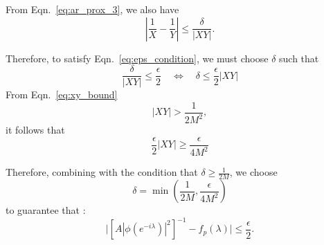 \documentclass[preprint]{aastex}
\theoremstyle{nonitalicname}
\theoremstyle{plain}
\theoremstyle{remark}
\begin{document}
From Eqn.~\ref{eq:ar_prox_3}, we also have
\begin{equation}\label{eq:delta_condition}
\left| \frac{1}{X} - \frac{1}{Y} \right| \leq \frac{\delta}{|XY|}.
\end{equation}

Therefore, to satisfy Eqn.~\ref{eq:eps_condition}, we must choose $\delta$ such that
\begin{equation}\label{eq:choose_delta}
\frac{\delta}{|XY|} \leq \frac{\epsilon}{2}
\quad \Longleftrightarrow \quad
\delta \leq \frac{\epsilon}{2} |XY|
\end{equation}
From Eqn.~\ref{eq:xy_bound}
\begin{equation}
|XY| > \frac{1}{2M^2},
\end{equation}
it follows that
\begin{equation}\label{eq:final_delta}
\frac{\epsilon}{2}|XY| \geq \frac{\epsilon}{4M^2}
\end{equation}

Therefore, combining with the condition that $\delta \geq \frac{1}{2M}$, we choose 
$$\delta = \min \left( \frac{1}{2M}, \frac{\epsilon}{4M^2} \right)$$
 to guarantee that :
\begin{equation}
\big| [A|\phi(e^{-i\lambda})|^2]^{-1} - f_p(\lambda) \big|  \leq \frac{\epsilon}{2}.
\end{equation}





\newpage
\end{document}
